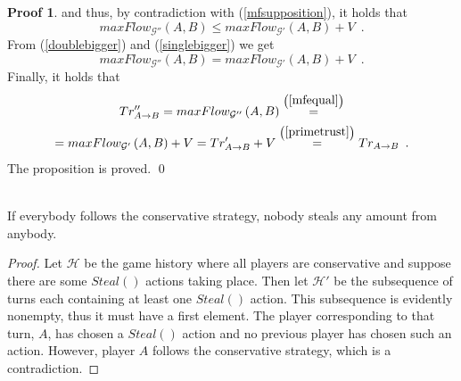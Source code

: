 \documentclass[11pt]{llncs}
\theoremstyle{definition}
\newtheorem{sepproof}{Proof}
\begin{document}
\begin{sepproof}
       and thus, by contradiction with (\ref{mfsupposition}), it holds that
       \begin{equation}
       \label{singlebigger}
          maxFlow_{\mathcal{G}''}\left(A, B\right) \leq maxFlow_{\mathcal{G}'}\left(A, B\right) + V \enspace.
       \end{equation}
       From (\ref{doublebigger}) and (\ref{singlebigger}) we get
       \begin{equation}
       \label{mfequal}
          maxFlow_{\mathcal{G}''}\left(A, B\right) = maxFlow_{\mathcal{G}'}\left(A, B\right) + V \enspace.
       \end{equation}
       Finally, it holds that
       \begin{equation*}
       \begin{gathered}
          Tr''_{A \rightarrow B} = maxFlow_{\mathcal{G}''}\left(A, B\right) \overset{\left(\ref{mfequal}\right)}{=} \\
          = maxFlow_{\mathcal{G}'}\left(A, B\right) + V = Tr'_{A \rightarrow B} + V
          \overset{\left(\ref{primetrust}\right)}{=} Tr_{A \rightarrow B} \enspace.
       \end{gathered}
       \end{equation*}
       The proposition is proved. \qed
    \end{sepproof}

    \begin{theorem} \ \\
       \label{conservativeworld}
       If everybody follows the conservative strategy, nobody steals any amount from anybody.
    \end{theorem}
     \begin{proof}
        Let $\mathcal{H}$ be the game history where all players are conservative and suppose there are some
        $Steal\left(\right)$ actions taking place. Then let $\mathcal{H}'$ be the subsequence of turns each containing at
        least one $Steal\left(\right)$ action. This subsequence is evidently nonempty, thus it must have a first element. The
        player corresponding to that turn, $A$, has chosen a $Steal\left(\right)$ action and no previous player has chosen
        such an action. However, player $A$ follows the conservative strategy, which is a contradiction.
     \end{proof}
\end{document}
